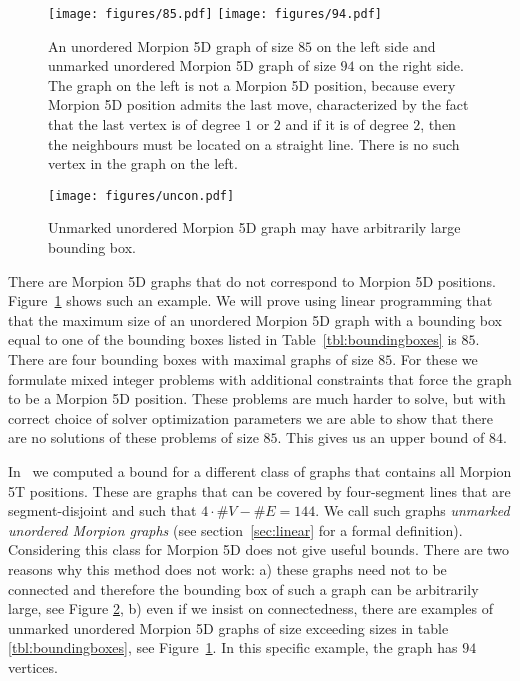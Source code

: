 \begin{figure}[h]
    \texttt{[image: figures/85.pdf]}
    \texttt{[image: figures/94.pdf]}
    \caption{\label{fig:85}
      An unordered Morpion 5D graph of size $85$ on the left side
        and unmarked unordered Morpion 5D graph of size $94$ on the right side. The graph on the left is not a Morpion 5D position, 
because every Morpion 5D position admits the last move, characterized by the fact that the last vertex is of degree $1$ or $2$ and if it is
of degree $2$, then the neighbours must be located on a straight line. There is no such vertex in the graph on the left.
    }
\end{figure}

\begin{figure}
  \centering
  \texttt{[image: figures/uncon.pdf]}
  \caption{
    Unmarked unordered Morpion 5D graph may have arbitrarily large bounding box.
  }
  \label{fig:uncon}
\end{figure}

There are Morpion 5D graphs that do not correspond to Morpion 5D positions.
Figure~\ref{fig:85} shows such an example. 
We will prove using linear programming that that the maximum size of  an unordered Morpion 5D graph with 
  a bounding box equal to one of the bounding boxes listed in Table~\ref{tbl:boundingboxes}
  is $85$. 
There are four bounding boxes with maximal graphs of size $85$. 
For these we formulate mixed integer problems with additional constraints that force the graph to
  be a Morpion 5D position.
These problems are much harder to solve, but with correct choice of solver optimization parameters we are able to show
  that there are no solutions of these problems of size $85$.
This gives us an upper bound of $84$. 

\begin{remark}
In~\cite{ijcai} we computed a bound for a different class of graphs that contains all Morpion 5T positions.
These are graphs that can be covered by four-segment lines that are segment-disjoint and such that $4\cdot \# V - \# E = 144$.
We call such graphs \emph{unmarked unordered Morpion graphs} (see section~\ref{sec:linear} for a formal definition).
Considering this class for Morpion 5D  does not give useful bounds. There are two reasons why this method does not work:
a) these graphs need not to be connected and therefore the bounding box of such a graph
  can be arbitrarily large, see Figure \ref{fig:uncon}, b) even if we insist on connectedness, there are examples of unmarked unordered Morpion 5D graphs of size exceeding sizes in 
table \ref{tbl:boundingboxes}, see Figure~\ref{fig:85}. In this specific example, the graph has $94$ vertices.
\end{remark}
